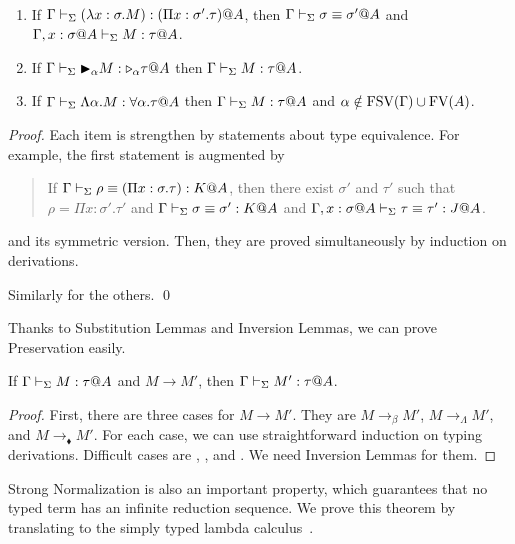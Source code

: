 \begin{lemma}[Inversion]\ 
  \begin{enumerate}
  \item If $\Gamma \vdash_\Sigma (\lambda x:\sigma.M) : (\Pi x:\sigma'.\tau)@A$,
    then $\Gamma \vdash_\Sigma \sigma \equiv \sigma'@A$ and $\G ,x:\sigma@A\V M:\tau @A$.
  \item If $\Gamma \vdash_\Sigma {\mathop{\blacktriangleright}}_\alpha M : {\mathop{\triangleright}}_\alpha \tau @A$ then $\Gamma \vdash_\Sigma M : \tau @A$.
  \item If $\Gamma \vdash_\Sigma \Lambda\alpha.M : \forall\alpha.\tau @A$ then $\Gamma \vdash_\Sigma M : \tau @A$ and $\alpha \notin \text{FSV}(\Gamma) \cup \text{FV}(A)$.
  \end{enumerate}
\end{lemma}

\begin{proof}
  Each item is strengthen by statements about type equivalence.
  For example, the first statement is augmented by
  \begin{quotation}
    If $\Gamma \vdash_\Sigma \rho \equiv (\Pi x:\sigma.\tau) : K @A$, then there exist
    $\sigma'$ and $\tau'$ such that $\rho = \Pi x:\sigma'.\tau'$ and
    $\Gamma \vdash_\Sigma \sigma \equiv \sigma' : K @A$ and
    $\G, x:\sigma@A\V \tau \E \tau' : J @A$.
  \end{quotation}
  and its symmetric version.  Then, they are proved simultaneously by induction on derivations.

  Similarly for the others.
 \qed
\end{proof}



Thanks to Substitution Lemmas and Inversion Lemmas, we can prove Preservation easily.

\begin{theorem}[Preservation]
	If $\Gamma\vdash_\Sigma M:\tau @A$ and $M \longrightarrow M'$, then $\Gamma\vdash_\Sigma M':\tau @A$.
\end{theorem}

\begin{proof}
	First, there are three cases for $M \longrightarrow M'$.
	They are $M \longrightarrow_\beta M'$, $M \longrightarrow_\Lambda M'$, and $M \longrightarrow_\blacklozenge M'$.
	For each case, we can use straightforward induction on typing derivations.
	Difficult cases are \TApp, \TTBL, and \TIns.
	We need Inversion Lemmas for them.
\end{proof}


Strong Normalization is also an important property, which guarantees that
no typed term has an infinite reduction sequence.
We prove this theorem by translating \LMD to the simply typed lambda calculus~\cite{harper1993framework}.

